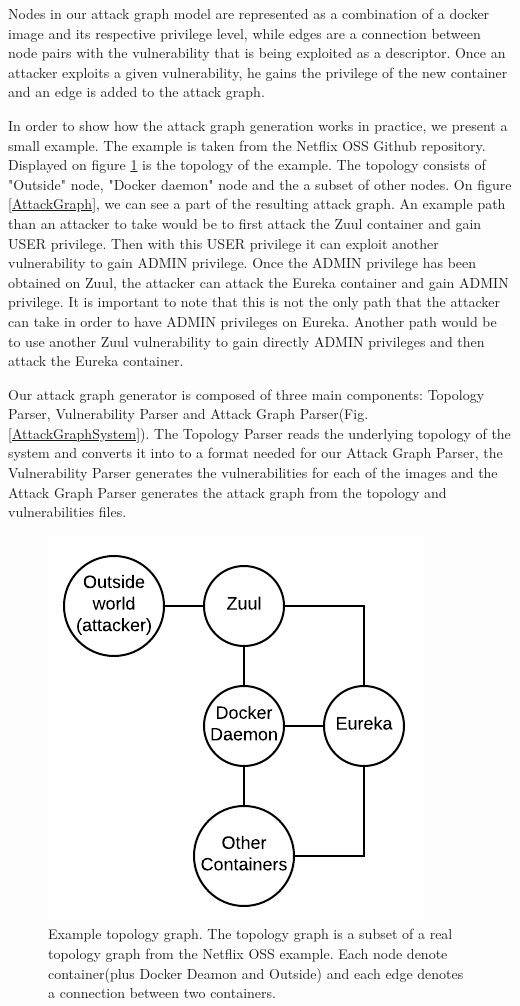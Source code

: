 \documentclass[letterpaper, 10 pt, conference]{ieeeconf}  %
\begin{document}
Nodes in our attack graph model are represented as a combination of a docker image and its respective privilege level, while edges are a connection between node pairs with the vulnerability that is being exploited as a descriptor. Once an attacker exploits a given vulnerability, he gains the privilege of the new container and an edge is added to the attack graph.

In order to show how the attack graph generation works in practice, we present a small example. The example is taken from the Netflix OSS Github repository. Displayed on figure \ref{TopologyGraph} is the topology of the example. The topology consists of "Outside" node, "Docker daemon" node and the a subset of other nodes. On figure \ref{AttackGraph}, we can see a part of the resulting attack graph. An example path than an attacker to take would be to first attack the Zuul container and gain USER privilege. Then with this USER privilege it can exploit another vulnerability to gain ADMIN privilege. Once the ADMIN privilege has been obtained on Zuul, the attacker can attack the Eureka container and gain ADMIN privilege. It is important to note that this is not the only path that the attacker can take in order to have ADMIN privileges on Eureka. Another path would be to use another Zuul vulnerability to gain directly ADMIN privileges and then attack the Eureka container.

Our attack graph generator is composed of three main components: Topology Parser, Vulnerability Parser and Attack Graph Parser(Fig. \ref{AttackGraphSystem}). The Topology Parser reads the underlying topology of the system and converts it into to a format needed for our Attack Graph Parser, the Vulnerability Parser generates the vulnerabilities for each of the images and the Attack Graph Parser generates the attack graph from the topology and vulnerabilities files. 

\begin{figure}
	\includegraphics[]{Topology_graph}
	\caption{Example topology graph. The topology graph is a subset of a real topology graph from the Netflix OSS example. Each node denote container(plus Docker Deamon and Outside) and each edge denotes a connection between two containers.}
	\label{TopologyGraph}
\end{figure}
\end{document}

